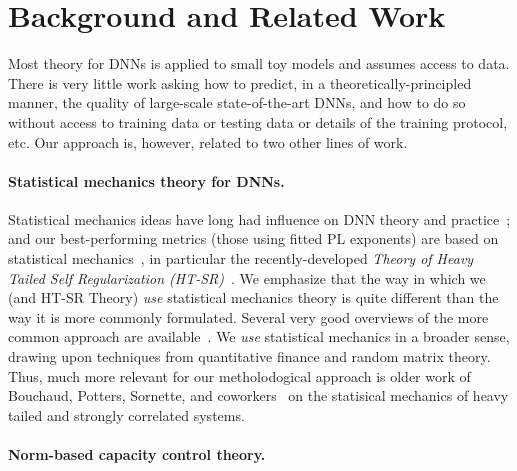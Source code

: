 \vspace{-1mm}
\section{Background and Related Work}
\label{sxn:background}

Most theory for DNNs is applied to small toy models and assumes access to data.
There is very little work asking how to predict, in a theoretically-principled manner, the quality of large-scale state-of-the-art DNNs, and how to do so without access to training data or testing data or details of the training protocol, etc.
Our 
approach  %
is, however, 
related to 
two  %
other lines of work.


\vspace{-1mm}
\paragraph{Statistical mechanics theory for DNNs.}

Statistical mechanics ideas have long had influence on DNN theory and practice~\cite{EB01_BOOK, MM17_TR, BKPx20}; and 
our best-performing metrics (those using fitted PL exponents) are based on statistical mechanics~\cite{MM17_TR, MM18_TR, MM19_HTSR_ICML, MM19_KDD, MM20_SDM}, in particular the recently-developed \emph{Theory of Heavy Tailed Self Regularization (HT-SR)}~\cite{MM18_TR, MM19_HTSR_ICML, MM20_SDM}.  
We emphasize that the way in which we (and HT-SR Theory) \emph{use} statistical mechanics theory is quite different than the way it is more commonly formulated.
Several very good overviews of the more common approach are available~\cite{EB01_BOOK, BKPx20}.
We \emph{use} statistical mechanics in a broader sense, drawing upon techniques from quantitative finance and random matrix theory.  %
Thus, much more relevant for our metholodogical approach is older work of Bouchaud, Potters, Sornette, and coworkers~\cite{BouchaudPotters03, SornetteBook, BP11, bun2017} on the statisical mechanics of heavy tailed and strongly correlated systems.


\vspace{-1mm}
\paragraph{Norm-based capacity control theory.}

